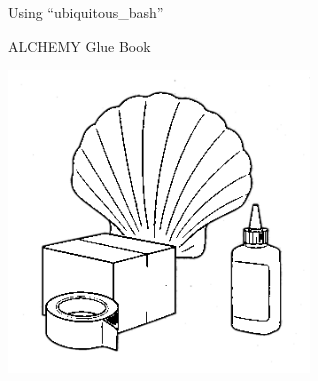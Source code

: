 \begin{titlepage}
\centering
{\Huge Using ``ubiquitous\_bash''}\par\vspace{1em}
{\LARGE ALCHEMY Glue Book}\par\vspace{1em}
{\Large }\par\vspace{2em}
\includegraphics[width=0.6\textwidth]{_lib/ALCHEMY/00-titlePage/mascott-ChatGPT_o3-small.png}
\end{titlepage}